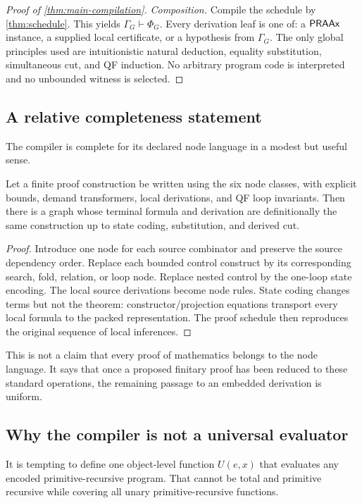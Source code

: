 \begin{proof}[Proof of \cref{thm:main-compilation}]
\emph{Composition.}  Compile the schedule by \cref{thm:schedule}.  This yields \(\Gamma_G\vdash\Phi_G\).  Every derivation leaf is one of: a \(\mathsf{PRAAx}\) instance, a supplied local certificate, or a hypothesis from \(\Gamma_G\).  The only global principles used are intuitionistic natural deduction, equality substitution, simultaneous cut, and QF induction.  No arbitrary program code is interpreted and no unbounded witness is selected.
\end{proof}

\subsection{A relative completeness statement}

The compiler is complete for its declared node language in a modest but useful sense.

\begin{proposition}
Let a finite proof construction be written using the six node classes, with explicit bounds, demand transformers, local derivations, and QF loop invariants.  Then there is a \KIFC graph whose terminal formula and derivation are definitionally the same construction up to state coding, substitution, and derived cut.
\end{proposition}

\begin{proof}
Introduce one node for each source combinator and preserve the source dependency order.  Replace each bounded control construct by its corresponding search, fold, relation, or loop node.  Replace nested control by the one-loop state encoding.  The local source derivations become node rules.  State coding changes terms but not the theorem: constructor/projection equations transport every local formula to the packed representation.  The proof schedule then reproduces the original sequence of local inferences.
\end{proof}

This is not a claim that every proof of mathematics belongs to the node language.  It says that once a proposed finitary proof has been reduced to these standard operations, the remaining passage to an embedded derivation is uniform.

\subsection{Why the compiler is not a universal evaluator}

It is tempting to define one object-level function \(U(e,x)\) that evaluates any encoded primitive-recursive program.  That cannot be total and primitive recursive while covering all unary primitive-recursive functions.

